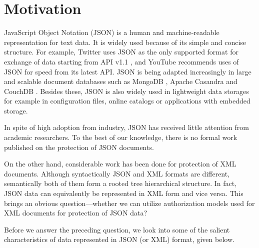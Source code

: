 \section{Motivation}
JavaScript Object Notation (JSON) is a human and machine-readable representation for text data.  It is widely used because of its simple and concise structure.  For example, Twitter uses  JSON as the only supported format for exchange of data starting from API v1.1 \cite{twitter-api}, and YouTube  recommends uses of JSON for speed from its latest API.  JSON  is being adapted increasingly in  large and scalable document databases such as MongoDB \cite{mongodb}, Apache Casandra \cite{cassandra} and CouchDB \cite{couchdb}. Besides  these, JSON is also widely used in lightweight data storages for example in configuration files, online catalogs or  applications with embedded storage.



In spite of high adoption from industry, JSON has received little attention from academic researchers. To the best of our knowledge, there is no formal work published  on the protection of JSON documents.


On the other hand, considerable work has been done for protection of XML documents. Although syntactically JSON and XML formats are different, semantically both of them form a rooted tree hierarchical structure. In fact, JSON data can equivalently be represented in XML form and vice versa. This brings an obvious question---whether we can utilize  authorization models used for XML documents for protection of  JSON data?


%

Before we answer the preceding question, we look into some of the salient characteristics of data represented in JSON (or XML) format, given below.  


